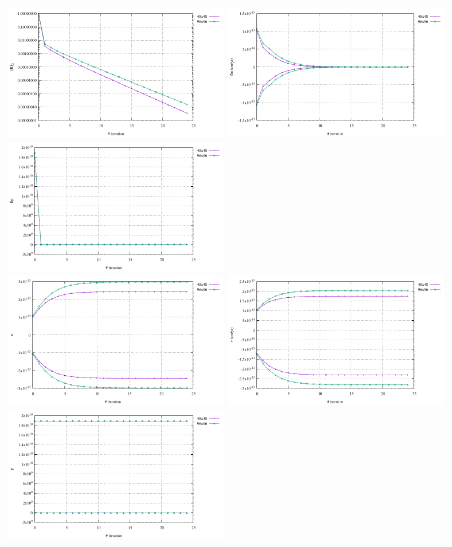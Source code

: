 \begin{center}
\includegraphics[width=5.7cm]{python_codes/fieldstone_87/results/experiment_06/conv}
\includegraphics[width=5.7cm]{python_codes/fieldstone_87/results/experiment_06/du}
\includegraphics[width=5.7cm]{python_codes/fieldstone_87/results/experiment_06/dp}\\
\includegraphics[width=5.7cm]{python_codes/fieldstone_87/results/experiment_06/u}
\includegraphics[width=5.7cm]{python_codes/fieldstone_87/results/experiment_06/v}
\includegraphics[width=5.7cm]{python_codes/fieldstone_87/results/experiment_06/p}
\end{center}


